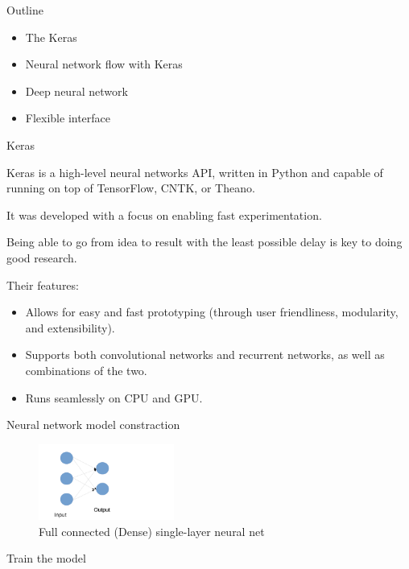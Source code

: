 \begin{frame}[plain]
  {Outline}

  \begin{itemize}
    \item The Keras
    \item Neural network flow with Keras
    \item Deep neural network
    \item Flexible interface
  \end{itemize}
\end{frame}

\begin{frame}[plain]
  {Keras}

  Keras is a high-level neural networks API, written in Python and capable of running on top of TensorFlow, CNTK, or Theano.
  
  It was developed with a focus on enabling fast experimentation.
  
  Being able to go from idea to result with the least possible delay is key to doing good research.

  Their features:
  \begin{itemize}
    \item Allows for easy and fast prototyping (through user friendliness, modularity, and extensibility).
    \item Supports both convolutional networks and recurrent networks, as well as combinations of the two.
    \item Runs seamlessly on CPU and GPU.
  \end{itemize}
\end{frame}

\begin{frame}[plain]
  {Neural network model constraction}

  \begin{figure}
    \centering
    \includegraphics[height=2.5cm]{keras.pdf}
    \caption{Full connected (Dense) single-layer neural net}
  \end{figure}
  
\end{frame}

\begin{frame}[plain]
  {Train the model}

  
\end{frame}

